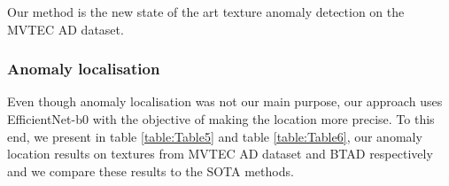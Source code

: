 \documentclass[a4paper,twoside]{article}
\begin{document}
Our method is the new state of the art texture anomaly detection on the MVTEC AD dataset.

\subsubsection{Anomaly localisation}

Even though anomaly localisation was not our main purpose, our approach uses EfficientNet-b0 with the objective of making the location more precise. To this end, we present in table \ref{table:Table5} and  table \ref{table:Table6}, our anomaly location results on textures from MVTEC AD dataset and BTAD respectively and we compare these results to the SOTA methods.

\begin{table}[h]
	\centering
    \captionsetup{justification=centering}
	\caption{\textbf{Pixel-AUROC comparison on MVTEC AD : MixedTeacher}}
	\footnotesize
	\setlength{\tabcolsep}{4pt}
	\renewcommand{\arraystretch}{1.3}
\end{table}
\end{document}
